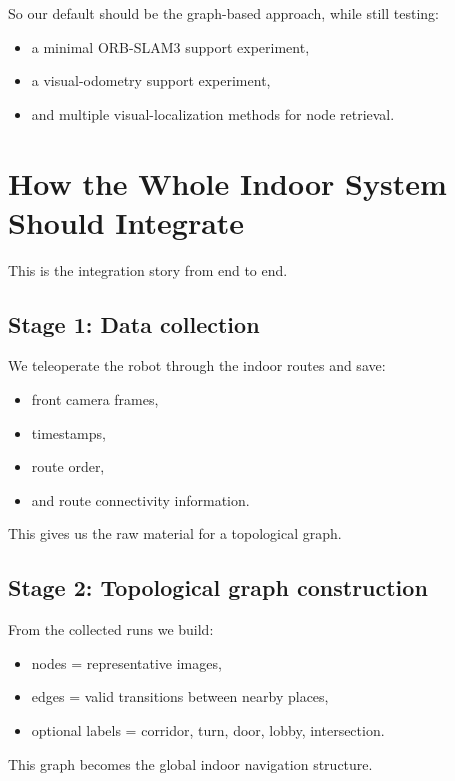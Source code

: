 \documentclass[11pt,a4paper]{article}
\begin{document}
So our default should be the graph-based approach, while still testing:
\begin{itemize}[nosep]
  \item a minimal ORB-SLAM3 support experiment,
  \item a visual-odometry support experiment,
  \item and multiple visual-localization methods for node retrieval.
\end{itemize}


\section{How the Whole Indoor System Should Integrate}

This is the integration story from end to end.

\subsection{Stage 1: Data collection}

We teleoperate the robot through the indoor routes and save:
\begin{itemize}[nosep]
  \item front camera frames,
  \item timestamps,
  \item route order,
  \item and route connectivity information.
\end{itemize}

This gives us the raw material for a topological graph.

\subsection{Stage 2: Topological graph construction}

From the collected runs we build:
\begin{itemize}[nosep]
  \item nodes = representative images,
  \item edges = valid transitions between nearby places,
  \item optional labels = corridor, turn, door, lobby, intersection.
\end{itemize}

This graph becomes the global indoor navigation structure.
\end{document}
